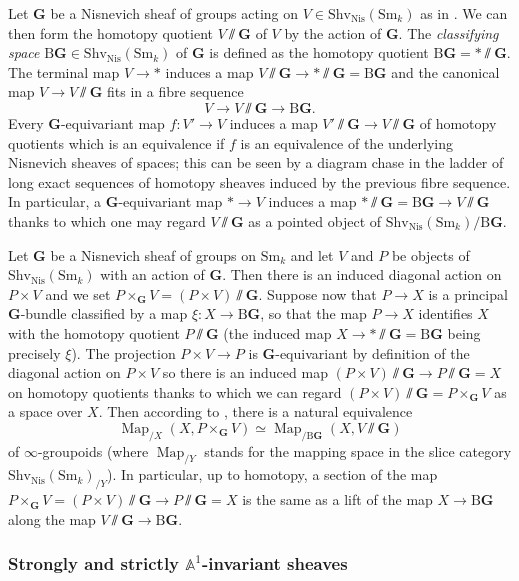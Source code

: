 \documentclass[11pt,leqno]{amsart}
\renewcommand{\1}{{\rm 1\hspace*{-0.4ex}%
\rule{0.1ex}{1.52ex}\hspace*{0.2ex}}}
\newcommand{\Nis}{{\operatorname{Nis}}}
\newcommand{\Shv}{{\mathrm{Shv}}}
\newcommand{\Sm}{\mathrm{Sm}}
\newcommand{\<}[1]{{\langle}#1 {\rangle}}
\newcommand{\Abb}{\mathbb{A}}
\newcommand{\Gbf}{\mathbf{G}}
\newcommand{\Br}{\mathrm{B}}
\newcommand{\Map}{\operatorname{Map}}
\theoremstyle{plain}
\theoremstyle{definition}
\theoremstyle{remark}
\numberwithin{equation}{section}
\begin{document}
Let $\Gbf$ be a Nisnevich sheaf of groups acting on $V\in\Shv_\Nis(\Sm_k)$ as in \cite[Definition 3.1]{nikolausPrincipalinftybundlesGeneral2015}. We can then form the homotopy quotient $V\sslash\Gbf$ of $V$ by the action of $\Gbf$. The \emph{classifying space} $\Br\Gbf\in\Shv_\Nis(\Sm_k)$ of $\Gbf$ is defined as the homotopy quotient $\Br\Gbf=*\sslash\Gbf$. The terminal map $V\to *$ induces a map $V\sslash\Gbf\to *\sslash\Gbf=\Br\Gbf$ and the canonical map $V\to V\sslash\Gbf$ fits in a fibre sequence \[V\to V\sslash\Gbf\to \Br\Gbf.\] Every $\Gbf$-equivariant map $f:V'\to V$ induces a map $V'\sslash\Gbf\to V\sslash\Gbf$ of homotopy quotients which is an equivalence if $f$ is an equivalence of the underlying Nisnevich sheaves of spaces; this can be seen by a diagram chase in the ladder of long exact sequences of homotopy sheaves induced by the previous fibre sequence. In particular, a $\Gbf$-equivariant map $*\to V$ induces a map $*\sslash\Gbf=\Br\Gbf\to V\sslash\Gbf$ thanks to which one may regard $V\sslash\Gbf$ as a pointed object of $\Shv_\Nis(\Sm_k)/\Br\Gbf$.

Let $\Gbf$ be a Nisnevich sheaf of groups on $\Sm_k$ and let $V$ and $P$ be objects of $\Shv_\Nis(\Sm_k)$ with an action of $\Gbf$. Then there is an induced diagonal action on $P\times V$ and we set $P\times_\Gbf V=(P\times V)\sslash\Gbf$. Suppose now that $P\to X$ is a principal $\Gbf$-bundle classified by a map $\xi:X\to\Br\Gbf$, so that the map $P\to X$ identifies $X$ with the homotopy quotient $P\sslash\Gbf$ (the induced map $X\to *\sslash\Gbf=\Br\Gbf$ being precisely $\xi$). The projection $P\times V\to P$ is $\Gbf$-equivariant by definition of the diagonal action on $P\times V$ so there is an induced map $(P\times V)\sslash\Gbf\to P\sslash\Gbf=X$ on homotopy quotients thanks to which we can regard $(P\times V)\sslash\Gbf=P\times_\Gbf V$ as a space over $X$. Then according to \cite[Proposition 4.17]{nikolausPrincipalinftybundlesGeneral2015}, there is a natural equivalence 
\begin{equation}\label{eq:equivalence_lifts}
\Map_{/X}(X,P\times_\Gbf V)\simeq\Map_{/\Br\Gbf}(X,V\sslash\Gbf)  
\end{equation}
of $\infty$-groupoids (where $\Map_{/Y}$ stands for the mapping space in the slice category $\Shv_\Nis(\Sm_k)_{/Y}$). In particular, up to homotopy, a section of the map $P\times_\Gbf V=(P\times V)\sslash\Gbf\rightarrow P\sslash\Gbf=X$ is the same as a lift of the map $X\rightarrow\Br\Gbf$ along the map $V\sslash\Gbf\rightarrow\Br\Gbf$.

\subsubsection*{Strongly and strictly $\Abb^1$-invariant sheaves}
\end{document}
